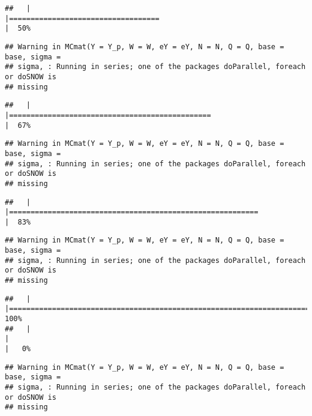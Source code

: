 \documentclass[]{article}
\begin{document}
\begin{verbatim}
##   |                                                                              |===================================                                   |  50%
\end{verbatim}

\begin{verbatim}
## Warning in MCmat(Y = Y_p, W = W, eY = eY, N = N, Q = Q, base = base, sigma =
## sigma, : Running in series; one of the packages doParallel, foreach or doSNOW is
## missing
\end{verbatim}

\begin{verbatim}
##   |                                                                              |===============================================                       |  67%
\end{verbatim}

\begin{verbatim}
## Warning in MCmat(Y = Y_p, W = W, eY = eY, N = N, Q = Q, base = base, sigma =
## sigma, : Running in series; one of the packages doParallel, foreach or doSNOW is
## missing
\end{verbatim}

\begin{verbatim}
##   |                                                                              |==========================================================            |  83%
\end{verbatim}

\begin{verbatim}
## Warning in MCmat(Y = Y_p, W = W, eY = eY, N = N, Q = Q, base = base, sigma =
## sigma, : Running in series; one of the packages doParallel, foreach or doSNOW is
## missing
\end{verbatim}

\begin{verbatim}
##   |                                                                              |======================================================================| 100%
##   |                                                                              |                                                                      |   0%
\end{verbatim}

\begin{verbatim}
## Warning in MCmat(Y = Y_p, W = W, eY = eY, N = N, Q = Q, base = base, sigma =
## sigma, : Running in series; one of the packages doParallel, foreach or doSNOW is
## missing
\end{verbatim}
\end{document}
